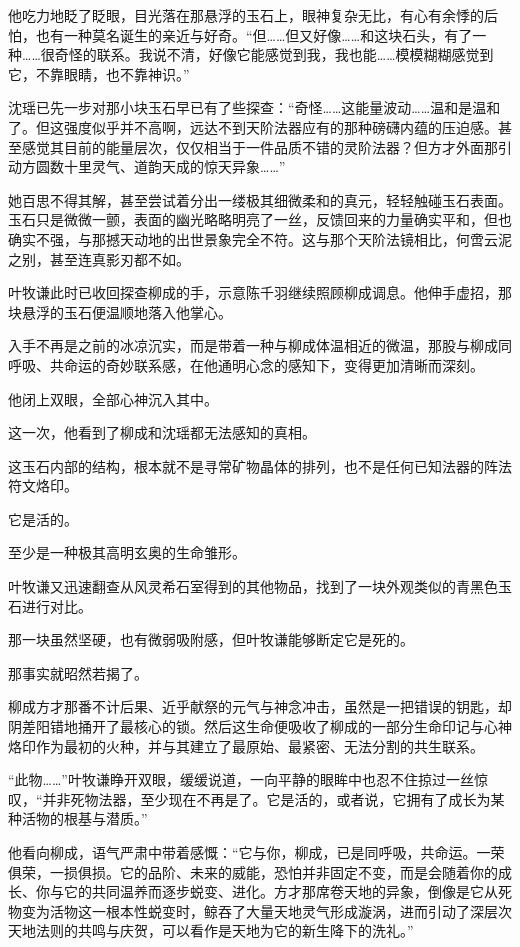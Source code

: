 他吃力地眨了眨眼，目光落在那悬浮的玉石上，眼神复杂无比，有心有余悸的后怕，也有一种莫名诞生的亲近与好奇。“但……但又好像……和这块石头，有了一种……很奇怪的联系。我说不清，好像它能感觉到我，我也能……模模糊糊感觉到它，不靠眼睛，也不靠神识。”

沈瑶已先一步对那小块玉石早已有了些探查：“奇怪……这能量波动……温和是温和了。但这强度似乎并不高啊，远达不到天阶法器应有的那种磅礴内蕴的压迫感。甚至感觉其目前的能量层次，仅仅相当于一件品质不错的灵阶法器？但方才外面那引动方圆数十里灵气、道韵天成的惊天异象……”

她百思不得其解，甚至尝试着分出一缕极其细微柔和的真元，轻轻触碰玉石表面。玉石只是微微一颤，表面的幽光略略明亮了一丝，反馈回来的力量确实平和，但也确实不强，与那撼天动地的出世景象完全不符。这与那个天阶法镜相比，何啻云泥之别，甚至连真影刃都不如。

叶牧谦此时已收回探查柳成的手，示意陈千羽继续照顾柳成调息。他伸手虚招，那块悬浮的玉石便温顺地落入他掌心。

入手不再是之前的冰凉沉实，而是带着一种与柳成体温相近的微温，那股与柳成同呼吸、共命运的奇妙联系感，在他通明心念的感知下，变得更加清晰而深刻。

他闭上双眼，全部心神沉入其中。

这一次，他看到了柳成和沈瑶都无法感知的真相。

这玉石内部的结构，根本就不是寻常矿物晶体的排列，也不是任何已知法器的阵法符文烙印。

它是活的。

至少是一种极其高明玄奥的生命雏形。

叶牧谦又迅速翻查从风灵希石室得到的其他物品，找到了一块外观类似的青黑色玉石进行对比。

那一块虽然坚硬，也有微弱吸附感，但叶牧谦能够断定它是死的。

那事实就昭然若揭了。

柳成方才那番不计后果、近乎献祭的元气与神念冲击，虽然是一把错误的钥匙，却阴差阳错地捅开了最核心的锁。然后这生命便吸收了柳成的一部分生命印记与心神烙印作为最初的火种，并与其建立了最原始、最紧密、无法分割的共生联系。

“此物……”叶牧谦睁开双眼，缓缓说道，一向平静的眼眸中也忍不住掠过一丝惊叹，“并非死物法器，至少现在不再是了。它是活的，或者说，它拥有了成长为某种活物的根基与潜质。”

他看向柳成，语气严肃中带着感慨：“它与你，柳成，已是同呼吸，共命运。一荣俱荣，一损俱损。它的品阶、未来的威能，恐怕并非固定不变，而是会随着你的成长、你与它的共同温养而逐步蜕变、进化。方才那席卷天地的异象，倒像是它从死物变为活物这一根本性蜕变时，鲸吞了大量天地灵气形成漩涡，进而引动了深层次天地法则的共鸣与庆贺，可以看作是天地为它的新生降下的洗礼。”

